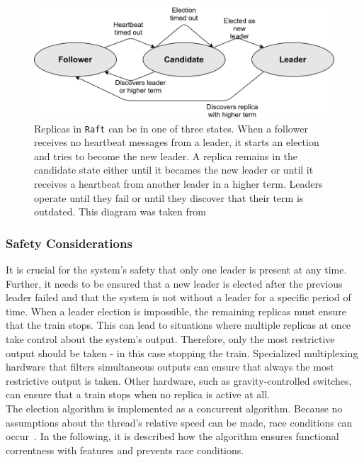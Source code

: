 \begin{figure}[!hb]
	\centering
	\includegraphics[width=0.75\linewidth]{images/RaftServerStates}
	\caption{Replicas in \texttt{Raft} can be in one of three states. When a follower receives no heartbeat messages from a leader, it starts an election and tries to become the new leader. A replica remains in the candidate state either until it becames the new leader or until it receives a heartbeat from another leader in a higher term. Leaders operate until they fail or until they discover that their term is outdated. This diagram was taken from~\cite{RaftConsensusPaper}}
	\label{fig:RaftServerStates}
\end{figure}


\subsubsection{Safety Considerations}
\label{subsub:raceConditions}

It is crucial for the system's safety that only one leader is present at any time.
Further, it needs to be ensured that a new leader is elected after the previous leader failed and that the system is not without a leader for a specific period of time.
When a leader election is impossible, the remaining replicas must ensure that the train stops.
This can lead to situations where multiple replicas at once take control about the system's output.
Therefore, only the most restrictive output should be taken - in this case stopping the train.
Specialized multiplexing hardware that filters simultaneous outputs can ensure that always the most restrictive output is taken.
Other hardware, such as gravity-controlled switches, can ensure that a train stops when no replica is active at all.
\\

The election algorithm is implemented as a concurrent algorithm.
Because no assumptions about the thread's relative speed can be made, race conditions can occur~\cite{Dijkstra1965}.
In the following, it is described how the algorithm ensures functional correntness with  features and prevents race conditions.


